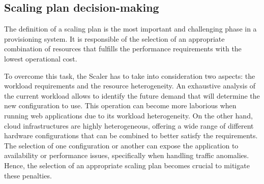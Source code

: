 \subsection{Scaling plan decision-making}

The definition of a scaling plan is the most important and challenging phase in a provisioning system. It is responsible of the selection of an appropriate combination of resources that fulfills the performance requirements with the lowest operational cost. 



To overcome this task, the Scaler has to take into consideration two aspects: the workload requirements and the resource heterogeneity. An exhaustive analysis of the current workload allows to identify the future demand that will determine the new configuration to use. This operation can become more laborious when running web applications due to its workload heterogeneity. On the other hand, cloud infrastructures are highly heterogeneous, offering a wide range of different hardware configurations that can be combined to better satisfy the requirements. The selection of one configuration or another can expose the application to availability or performance issues, specifically when handling traffic anomalies. Hence, the selection of an appropriate scaling plan becomes crucial to mitigate these penalties. 





